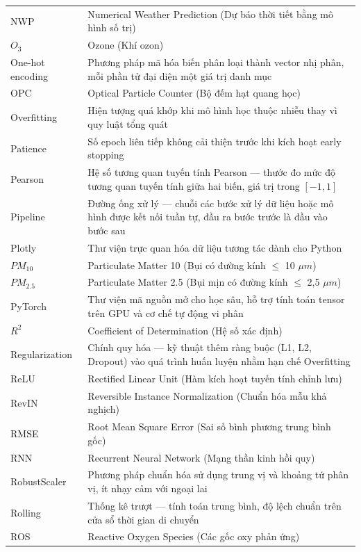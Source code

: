 \begin{longtable}{p{4.2cm} p{10.3cm}}
    NWP & Numerical Weather Prediction (Dự báo thời tiết bằng mô hình số trị) \\
    $O_3$ & Ozone (Khí ozon) \\
    One-hot encoding & Phương pháp mã hóa biến phân loại thành vector nhị phân, mỗi phần tử đại diện một giá trị danh mục \\
    OPC & Optical Particle Counter (Bộ đếm hạt quang học) \\
    Overfitting & Hiện tượng quá khớp khi mô hình học thuộc nhiễu thay vì quy luật tổng quát \\
    Patience & Số epoch liên tiếp không cải thiện trước khi kích hoạt early stopping \\
    Pearson & Hệ số tương quan tuyến tính Pearson --- thước đo mức độ tương quan tuyến tính giữa hai biến, giá trị trong $[-1, 1]$ \\
    Pipeline & Đường ống xử lý --- chuỗi các bước xử lý dữ liệu hoặc mô hình được kết nối tuần tự, đầu ra bước trước là đầu vào bước sau \\
    Plotly & Thư viện trực quan hóa dữ liệu tương tác dành cho Python \\
    $PM_{10}$ & Particulate Matter 10 (Bụi có đường kính $\leq$ 10 $\mu m$) \\
    $PM_{2.5}$ & Particulate Matter 2.5 (Bụi mịn có đường kính $\leq$ 2,5 $\mu m$) \\
    PyTorch & Thư viện mã nguồn mở cho học sâu, hỗ trợ tính toán tensor trên GPU và cơ chế tự động vi phân \\
    $R^2$ & Coefficient of Determination (Hệ số xác định) \\
    Regularization & Chính quy hóa --- kỹ thuật thêm ràng buộc (L1, L2, Dropout) vào quá trình huấn luyện nhằm hạn chế Overfitting \\
    ReLU & Rectified Linear Unit (Hàm kích hoạt tuyến tính chỉnh lưu) \\
    RevIN & Reversible Instance Normalization (Chuẩn hóa mẫu khả nghịch) \\
    RMSE & Root Mean Square Error (Sai số bình phương trung bình gốc) \\
    RNN & Recurrent Neural Network (Mạng thần kinh hồi quy) \\
    RobustScaler & Phương pháp chuẩn hóa sử dụng trung vị và khoảng tứ phân vị, ít nhạy cảm với ngoại lai \\
    Rolling & Thống kê trượt --- tính toán trung bình, độ lệch chuẩn trên cửa sổ thời gian di chuyển \\
    ROS & Reactive Oxygen Species (Các gốc oxy phản ứng) \\

\end{longtable}

